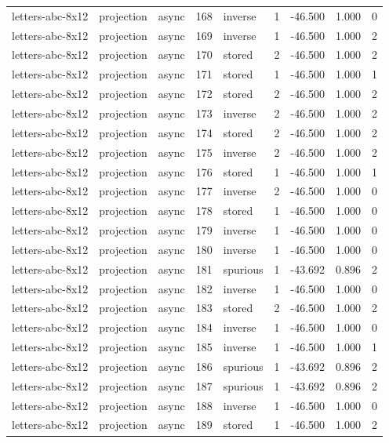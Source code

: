 \begin{tabular}{lllrlrrrr}
letters-abc-8x12 & projection & async & 168 & inverse & 1 & -46.500 & 1.000 & 0 \\
letters-abc-8x12 & projection & async & 169 & inverse & 1 & -46.500 & 1.000 & 2 \\
letters-abc-8x12 & projection & async & 170 & stored & 2 & -46.500 & 1.000 & 2 \\
letters-abc-8x12 & projection & async & 171 & stored & 1 & -46.500 & 1.000 & 1 \\
letters-abc-8x12 & projection & async & 172 & stored & 2 & -46.500 & 1.000 & 2 \\
letters-abc-8x12 & projection & async & 173 & inverse & 2 & -46.500 & 1.000 & 2 \\
letters-abc-8x12 & projection & async & 174 & stored & 2 & -46.500 & 1.000 & 2 \\
letters-abc-8x12 & projection & async & 175 & inverse & 2 & -46.500 & 1.000 & 2 \\
letters-abc-8x12 & projection & async & 176 & stored & 1 & -46.500 & 1.000 & 1 \\
letters-abc-8x12 & projection & async & 177 & inverse & 2 & -46.500 & 1.000 & 0 \\
letters-abc-8x12 & projection & async & 178 & stored & 1 & -46.500 & 1.000 & 0 \\
letters-abc-8x12 & projection & async & 179 & inverse & 1 & -46.500 & 1.000 & 0 \\
letters-abc-8x12 & projection & async & 180 & inverse & 1 & -46.500 & 1.000 & 0 \\
letters-abc-8x12 & projection & async & 181 & spurious & 1 & -43.692 & 0.896 & 2 \\
letters-abc-8x12 & projection & async & 182 & inverse & 1 & -46.500 & 1.000 & 0 \\
letters-abc-8x12 & projection & async & 183 & stored & 2 & -46.500 & 1.000 & 2 \\
letters-abc-8x12 & projection & async & 184 & inverse & 1 & -46.500 & 1.000 & 0 \\
letters-abc-8x12 & projection & async & 185 & inverse & 1 & -46.500 & 1.000 & 1 \\
letters-abc-8x12 & projection & async & 186 & spurious & 1 & -43.692 & 0.896 & 2 \\
letters-abc-8x12 & projection & async & 187 & spurious & 1 & -43.692 & 0.896 & 2 \\
letters-abc-8x12 & projection & async & 188 & inverse & 1 & -46.500 & 1.000 & 0 \\
letters-abc-8x12 & projection & async & 189 & stored & 1 & -46.500 & 1.000 & 2 \\

\end{tabular}
